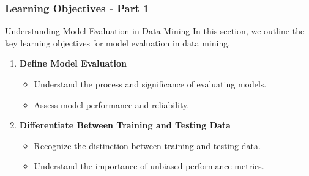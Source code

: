 \documentclass{beamer}
\begin{document}
\begin{frame}[fragile]
    \frametitle{Learning Objectives - Part 1}
    \begin{block}{Understanding Model Evaluation in Data Mining}
        In this section, we outline the key learning objectives for model evaluation in data mining.
    \end{block}
    
    \begin{enumerate}
        \item \textbf{Define Model Evaluation}
            \begin{itemize}
                \item Understand the process and significance of evaluating models.
                \item Assess model performance and reliability.
            \end{itemize}

        \item \textbf{Differentiate Between Training and Testing Data}
            \begin{itemize}
                \item Recognize the distinction between training and testing data. 
                \item Understand the importance of unbiased performance metrics.
            \end{itemize}
    \end{enumerate}
\end{frame}
\end{document}
